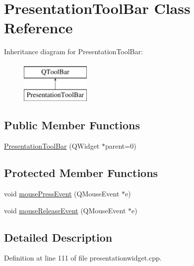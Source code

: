 \hypertarget{classPresentationToolBar}{\section{Presentation\+Tool\+Bar Class Reference}
\label{classPresentationToolBar}
}
Inheritance diagram for Presentation\+Tool\+Bar\+:\begin{figure}[H]
\begin{center}
\leavevmode
\includegraphics[height=2.000000cm]{classPresentationToolBar}
\end{center}
\end{figure}
\subsection*{Public Member Functions}
\begin{DoxyCompactItemize}
\item 
\hyperlink{classPresentationToolBar_aa675fcc2e3ec994f27dbcb864821dbc0}{Presentation\+Tool\+Bar} (Q\+Widget $\ast$parent=0)
\end{DoxyCompactItemize}
\subsection*{Protected Member Functions}
\begin{DoxyCompactItemize}
\item 
void \hyperlink{classPresentationToolBar_af176760a5966b8429faa7be5693b5116}{mouse\+Press\+Event} (Q\+Mouse\+Event $\ast$e)
\item 
void \hyperlink{classPresentationToolBar_a92354439ee056e5055c8c9e548067d7f}{mouse\+Release\+Event} (Q\+Mouse\+Event $\ast$e)
\end{DoxyCompactItemize}


\subsection{Detailed Description}


Definition at line 111 of file presentationwidget.\+cpp.



